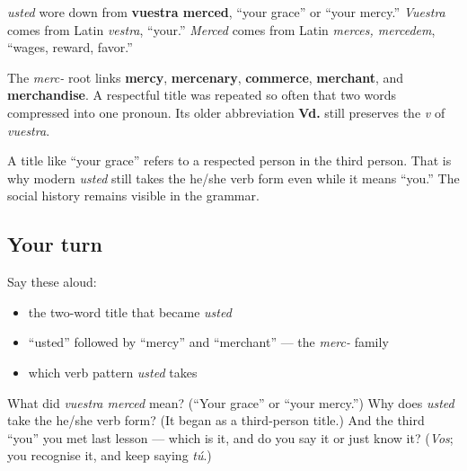\begin{cousinweb}
\emph{usted} wore down from \textbf{vuestra merced}, \textquotedblleft{}your grace\textquotedblright{} or \textquotedblleft{}your mercy.\textquotedblright{} \emph{Vuestra} comes from Latin \emph{vestra}, \textquotedblleft{}your.\textquotedblright{} \emph{Merced} comes from Latin \emph{merces, mercedem}, \textquotedblleft{}wages, reward, favor.\textquotedblright{}

The \emph{merc-} root links \textbf{mercy}, \textbf{mercenary}, \textbf{commerce}, \textbf{merchant}, and \textbf{merchandise}. A respectful title was repeated so often that two words compressed into one pronoun. Its older abbreviation \textbf{Vd.} still preserves the \emph{v} of \emph{vuestra}.
\end{cousinweb}

\begin{culture}
A title like \textquotedblleft{}your grace\textquotedblright{} refers to a respected person in the third person. That is why modern \emph{usted} still takes the he/she verb form even while it means \textquotedblleft{}you.\textquotedblright{} The social history remains visible in the grammar.
\end{culture}

\subsection*{Your turn}
Say these aloud:

\begin{itemize}
\raggedright
  \item the two-word title that became \emph{usted}
  \item \textquotedblleft{}usted\textquotedblright{} followed by \textquotedblleft{}mercy\textquotedblright{} and \textquotedblleft{}merchant\textquotedblright{} — the \emph{merc-} family
  \item which verb pattern \emph{usted} takes
\end{itemize}

\begin{tcolorbox}[breakable,colback=teal!4,colframe=teal!35!black,title={Before you move on}]
What did \emph{vuestra merced} mean? (\textquotedblleft{}Your grace\textquotedblright{} or \textquotedblleft{}your mercy.\textquotedblright{}) Why does \emph{usted} take the he/she verb form? (It began as a third-person title.) And the third \textquotedblleft{}you\textquotedblright{} you met last lesson — which is it, and do you say it or just know it? (\emph{Vos}; you recognise it, and keep saying \emph{tú}.)
\end{tcolorbox}
